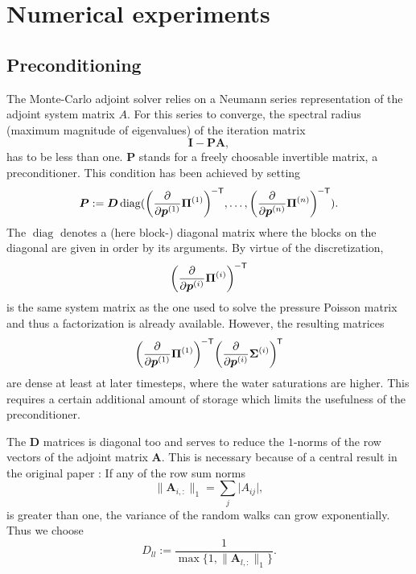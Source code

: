 \documentclass[conference]{IEEEtran}
\newcommand*{\pdiff}[2]{\ensuremath{\frac{\partial}{\partial{#2}}{#1}}}
\renewcommand*{\vec}[1]{\ensuremath{{\bm{#1}}}}
\newcommand*{\mat}[1]{\vec{#1}}
\newcommand*{\transpose}[1]{{#1}^{\mkern-1.5mu\mathsf{T}}}
\newcommand*{\transposeinvert}[1]{{#1}^{\mkern-1.5mu\mathsf{-T}}}
\begin{document}
\section{Numerical experiments}
\label{experiments}
\subsection{Preconditioning}
The Monte-Carlo adjoint solver relies on a Neumann series representation of the adjoint system matrix $A$.
For this series to converge, the spectral radius (maximum magnitude of eigenvalues) of the iteration matrix
\begin{equation}
\mat{I} - \mat{PA},
\end{equation}
has to be less than one. $\mat{P}$ stands for a freely choosable invertible matrix, a preconditioner.
This condition has been achieved by setting
\begin{equation}
\label{preconditioner}
\mat{P} := \mat{D}\operatorname{diag}(\transposeinvert{\left(\pdiff{\vec{\Pi}^{(1)}}{\vec{p}^{(1)}}\right)}, \ldots, \transposeinvert{\left(\pdiff{\vec{\Pi}^{(n)}}{\vec{p}^{(n)}}\right)}).
\end{equation}
The $\operatorname{diag}$ denotes a (here block-) diagonal matrix where the blocks on the diagonal are given in order by its arguments.
By virtue of the discretization,
\begin{equation}
\transposeinvert{\left(\pdiff{\vec{\Pi}^{(i)}}{\vec{p}^{(i)}}\right)}
\end{equation}
is the same system matrix as the one used to solve the pressure Poisson matrix and thus a  factorization is already available.
However, the resulting matrices 
\begin{equation}
\transposeinvert{\left(\pdiff{\vec{\Pi}^{(1)}}{\vec{p}^{(1)}}\right)}\transpose{\left(\pdiff{\vec{\Sigma}^{(i)}}{\vec{p}^{(i)}}\right)}
\end{equation}
are dense at least at later timesteps, where the water saturations are higher.
This requires a certain additional amount of storage which limits the usefulness of the preconditioner.

The $\mat{D}$ matrices is diagonal too and serves to reduce the $1$-norms of the row vectors of the adjoint matrix $\mat{A}$.
This is necessary because of a central result in the original paper \cite{unsteady}:
If any of the row sum norms 
\begin{equation}
\lVert{\mat{A}_{i, :}}\rVert_1 = \sum_{j} \lvert A_{ij} \rvert,
\end{equation}
is greater than one, the variance of the random walks can grow exponentially.
Thus we choose
\begin{equation}
D_{ll} := \frac{1}{\max\{1, \lVert{\mat{A}_{l, :}}\rVert_1\}}.
\end{equation}
\end{document}
